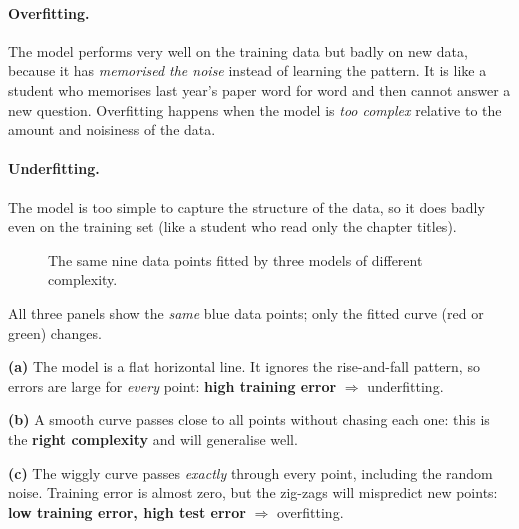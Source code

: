 \paragraph{Overfitting.} The model performs very well on the training data but badly on new data, because it has \emph{memorised the noise} instead of learning the pattern. It is like a student who memorises last year's paper word for word and then cannot answer a new question. Overfitting happens when the model is \emph{too complex} relative to the amount and noisiness of the data.

\paragraph{Underfitting.} The model is too simple to capture the structure of the data, so it does badly even on the training set (like a student who read only the chapter titles).

\begin{figure}[!htbp]
\centering
{}
\caption{The same nine data points fitted by three models of different complexity.}\label{fig:fits}
\end{figure}

\begin{explain}
All three panels show the \emph{same} blue data points; only the fitted curve (red or green) changes.\par
\textbf{(a)} The model is a flat horizontal line. It ignores the rise-and-fall pattern, so errors are large for \emph{every} point: \textbf{high training error} $\Rightarrow$ underfitting.\par
\textbf{(b)} A smooth curve passes close to all points without chasing each one: this is the \textbf{right complexity} and will generalise well.\par
\textbf{(c)} The wiggly curve passes \emph{exactly} through every point, including the random noise. Training error is almost zero, but the zig-zags will mispredict new points: \textbf{low training error, high test error} $\Rightarrow$ overfitting.
\end{explain}

